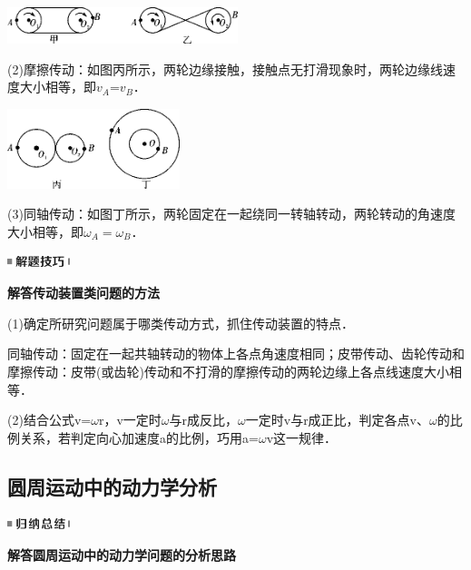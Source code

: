 \documentclass[cn,10.5pt,chinese,mac,chinesefont=founder]{elegantbook}
\begin{document}
\begin{center}\includegraphics[width=2.65in,height=0.41667in]{media/image181.png}\end{center}

(2)摩擦传动：如图丙所示，两轮边缘接触，接触点无打滑现象时，两轮边缘线速度大小相等，即$v_A$=$v_B$．

\begin{center}\includegraphics[width=1.98333in,height=0.91667in]{media/image182.png}\end{center}

(3)同轴传动：如图丁所示，两轮固定在一起绕同一转轴转动，两轮转动的角速度大小相等，即$\omega_A=\omega_B$．

\begin{center}\includegraphics[width=0.71667in,height=0.13333in]{media/image37.png}

\textbf{解答传动装置类问题的方法}
\end{center}


(1)确定所研究问题属于哪类传动方式，抓住传动装置的特点．

同轴传动：固定在一起共轴转动的物体上各点角速度相同；皮带传动、齿轮传动和摩擦传动：皮带(或齿轮)传动和不打滑的摩擦传动的两轮边缘上各点线速度大小相等．

(2)结合公式v=$\omega$r，v一定时$\omega$与r成反比，$\omega$一定时v与r成正比，判定各点v、$\omega$的比例关系，若判定向心加速度a的比例，巧用a=$\omega$v这一规律．



\newpage
\subsection{圆周运动中的动力学分析}

\begin{center}\includegraphics[width=0.71667in,height=0.13333in]{media/image13.png}

\textbf{解答圆周运动中的动力学问题的分析思路}
\end{center}
\end{document}
